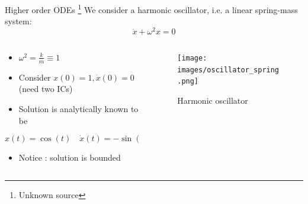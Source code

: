 \documentclass[presentation]{beamer}
\begin{document}
\begin{frame}[label={sec:org47a14d8}]{Higher order ODEs \footnote{Unknown source}}
We consider a harmonic oscillator, i.e. a linear spring-mass system:
\[ \ddot{x} + \omega^2 x = 0\]
\begin{columns}
\begin{column}{0.6\columnwidth}
\begin{itemize}
\item \(\omega^2 = \frac{k}{m} \equiv 1\)
\item Consider \(x(0) = 1, \dot{x}(0) = 0\) (need two ICs)
\item Solution is analytically known to be
\end{itemize}
\[ x(t) = \cos(t) \quad \dot{x}(t) = -\sin(t) \]
\begin{itemize}
\item Notice : solution is bounded
\end{itemize}
\end{column}
\begin{column}{0.4\columnwidth}
\begin{figure}[htbp]
\centering
\texttt{[image: images/oscillator\_spring.png]}
\caption{Harmonic oscillator}
\end{figure}
\end{column}
\end{columns}
\end{frame}
\end{document}
